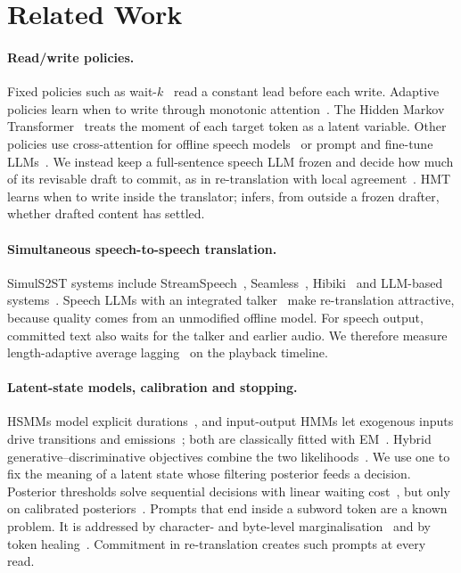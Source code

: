 \section{Related Work}
\label{sec:related}

\paragraph{Read/write policies.}
Fixed policies such as wait-$k$~\citep{ma2019stacl} read a constant lead before each write.
Adaptive policies learn when to write through monotonic attention~\citep{arivazhagan2019monotonic,ma2020mma}.
The Hidden Markov Transformer~\citep{zhang2023hmt} treats the moment of each target token as a latent variable.
Other policies use cross-attention for offline speech models~\citep{papi2023attention,papi2023alignatt,papi2024streamatt} or prompt and fine-tune LLMs~\citep{koshkin2024transllama,ouyang2025taf,cheng2025liveinterpret}.
We instead keep a full-sentence speech LLM frozen and decide how much of its revisable draft to commit, as in re-translation with local agreement~\citep{arivazhagan2020retranslation,liu2020low,polak2022cuni,machacek2023turning}.
HMT learns when to write inside the translator; \ours{} infers, from outside a frozen drafter, whether drafted content has settled.

\paragraph{Simultaneous speech-to-speech translation.}
SimulS2ST systems include StreamSpeech~\citep{zhang2024streamspeech}, Seamless~\citep{seamless2023}, Hibiki~\citep{labiausse2025hibiki} and LLM-based systems~\citep{deng2025simuls2s}.
Speech LLMs with an integrated talker~\citep{xu2025qwen3omni,uniss2025} make re-translation attractive, because quality comes from an unmodified offline model.
For speech output, committed text also waits for the talker and earlier audio.
We therefore measure length-adaptive average lagging~\citep{papi2022over} on the playback timeline.

\paragraph{Latent-state models, calibration and stopping.}
HSMMs model explicit durations~\citep{yu2010hsmm}, and input-output HMMs let exogenous inputs drive transitions and emissions~\citep{bengio1995iohmm}; both are classically fitted with EM~\citep{dempster1977em,rabiner1989tutorial}.
Hybrid generative--discriminative objectives combine the two likelihoods~\citep{bishop2007generative}.
We use one to fix the meaning of a latent state whose filtering posterior feeds a decision.
Posterior thresholds solve sequential decisions with linear waiting cost~\citep{wald1948optimum,degroot1970optimal,shiryaev1978optimal}, but only on calibrated posteriors~\citep{guo2017calibration}.
Prompts that end inside a subword token are a known problem.
It is addressed by character- and byte-level marginalisation~\citep{vieira2025characters,phan2025exact} and by token healing~\citep{lundberg2023tokenhealing}.
Commitment in re-translation creates such prompts at every read.
